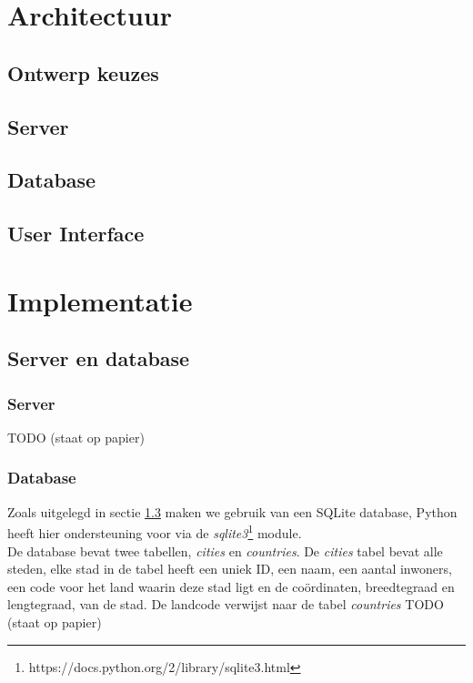 \documentclass[twoside,openright]{uva-bachelor-thesis}
\begin{document}
\chapter{Architectuur}
	\section{Ontwerp keuzes}
	\section{Server}
	\section{Database}
	\label{sec:db}
	\section{User Interface}
	
\chapter{Implementatie}
	\section{Server en database}
		\subsection{Server}
		TODO (staat op papier)
		\subsection{Database}
			Zoals uitgelegd in sectie \ref{sec:db} maken we gebruik van een SQLite database, Python heeft hier ondersteuning voor via de \textit{sqlite3}\footnote{https://docs.python.org/2/library/sqlite3.html} module.\\[0.5cm]
			De database bevat twee tabellen, \textit{cities} en \textit{countries}. De \textit{cities} tabel bevat alle steden, elke stad in de tabel heeft een uniek ID, een naam, een aantal inwoners, een code voor het land waarin deze stad ligt en de co\"ordinaten, breedtegraad en lengtegraad, van de stad. De landcode verwijst naar de tabel \textit{countries} 
			TODO (staat op papier)
\end{document}
